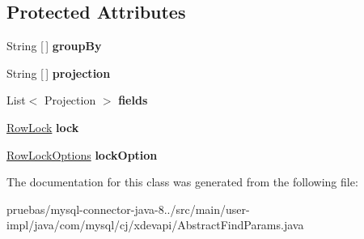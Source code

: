 \subsection*{Protected Attributes}
\begin{DoxyCompactItemize}
\item 
\mbox{\label{classcom_1_1mysql_1_1cj_1_1xdevapi_1_1_abstract_find_params_af3bcff376fbbd9c8844219fb37404547}} 
String \mbox{[}$\,$\mbox{]} {\bfseries group\+By}
\item 
\mbox{\label{classcom_1_1mysql_1_1cj_1_1xdevapi_1_1_abstract_find_params_aa2f21464c6948fd8938d5663b997a18a}} 
String \mbox{[}$\,$\mbox{]} {\bfseries projection}
\item 
\mbox{\label{classcom_1_1mysql_1_1cj_1_1xdevapi_1_1_abstract_find_params_a910c634442c878086a71cfac6f984f3f}} 
List$<$ Projection $>$ {\bfseries fields}
\item 
\mbox{\label{classcom_1_1mysql_1_1cj_1_1xdevapi_1_1_abstract_find_params_a5678caf52fa61223c04440a9d9c0a63b}} 
\mbox{\hyperlink{enumcom_1_1mysql_1_1cj_1_1xdevapi_1_1_find_params_1_1_row_lock}{Row\+Lock}} {\bfseries lock}
\item 
\mbox{\label{classcom_1_1mysql_1_1cj_1_1xdevapi_1_1_abstract_find_params_a377d2b6854306fcce18c8a69f5ee5453}} 
\mbox{\hyperlink{enumcom_1_1mysql_1_1cj_1_1xdevapi_1_1_find_params_1_1_row_lock_options}{Row\+Lock\+Options}} {\bfseries lock\+Option}
\end{DoxyCompactItemize}


The documentation for this class was generated from the following file\+:\begin{DoxyCompactItemize}
\item 
pruebas/mysql-\/connector-\/java-\/8../src/main/user-\/impl/java/com/mysql/cj/xdevapi/Abstract\+Find\+Params.\+java\end{DoxyCompactItemize}

